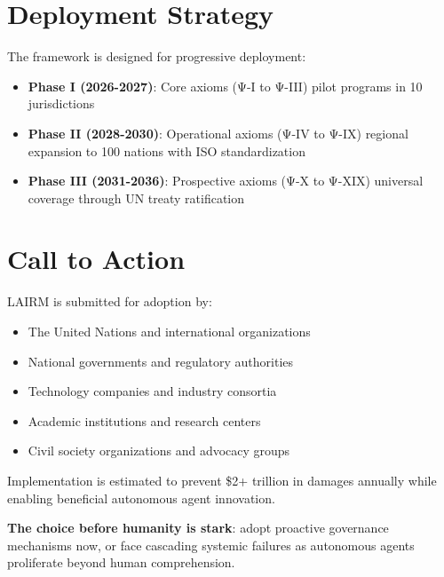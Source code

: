 \documentclass[12pt,a4paper,twoside,openright]{book}
\begin{document}
\vspace{0.5cm}

\section*{Deployment Strategy}

The framework is designed for progressive deployment:

\begin{itemize}
    \item \textbf{Phase I (2026-2027)}: Core axioms (Ψ-I to Ψ-III) pilot programs in 10 jurisdictions
    \item \textbf{Phase II (2028-2030)}: Operational axioms (Ψ-IV to Ψ-IX) regional expansion to 100 nations with ISO standardization
    \item \textbf{Phase III (2031-2036)}: Prospective axioms (Ψ-X to Ψ-XIX) universal coverage through UN treaty ratification
\end{itemize}

\vspace{0.5cm}

\section*{Call to Action}

LAIRM is submitted for adoption by:

\begin{itemize}
    \item The United Nations and international organizations
    \item National governments and regulatory authorities
    \item Technology companies and industry consortia
    \item Academic institutions and research centers
    \item Civil society organizations and advocacy groups
\end{itemize}

Implementation is estimated to prevent \$2+ trillion in damages annually while enabling beneficial autonomous agent innovation.

\vspace{0.5cm}

\begin{center}
\textbf{The choice before humanity is stark}: adopt proactive governance mechanisms now, or face cascading systemic failures as autonomous agents proliferate beyond human comprehension.
\end{center}
\end{document}
